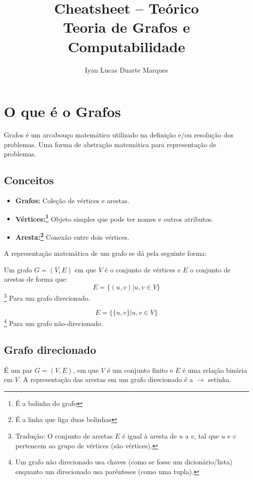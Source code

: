 \documentclass[12pt]{article}
\title{Cheatsheet -- Teórico\\ Teoria de Grafos e Computabilidade}
\author{Iyan Lucas Duarte Marques\inst{1}}
\begin{document}
\maketitle

\section{O que é o Grafos}
Grafos é um arcabouço matemático utilizado na definição e/ou resolução dos problemas.
Uma forma de abstração matemática para representação de problemas.

\subsection{Conceitos}
\begin{itemize}
	\item \textbf{Grafos:} Coleção de vértices e arestas.
	\item \textbf{Vértices:\footnote{
			      É a bolinha do grafo
		      }} Objeto simples que pode ter nomes e outros atributos.
	      \item\textbf{Aresta:\footnote{
			      É a linha que liga duas bolinhas
		      }} Conexão entre dois vértices.
\end{itemize}

A representação matemática de um grafo se dá pela seguinte forma:

Um grafo $G = (V,E)$ em que $V$ é o conjunto de vértices e $E$ o conjunto de arestas de forma que:
\begin{equation}
	E = \{(u, v) | u, v \in V\}
\end{equation}\footnote{
	Tradução: O conjunto de arestas $E$ é igual à aresta de $u$ a $v$, tal que $u$ e $v$ pertencem ao grupo de vértices (são vértices).
}
Para um grafo direcionado.

\begin{equation}
	E = \{\{u, v\} | u, v \in V\}
\end{equation}\footnote{
	Um grafo não direcionado usa chaves (como se fosse um dicionário/lista) enquanto um direcionado usa parênteses (como uma tupla).
}
Para um grafo não-direcionado.

\subsection{Grafo direcionado}
É um par $G = (V, E)$, em que $V$ é um conjunto finito e $E$ é uma relação binária em $V$.
A representação das arestas em um grafo direcionado é a $\longrightarrow$ setinha.
\end{document}
